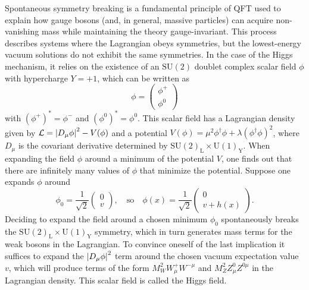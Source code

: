 Spontaneous symmetry breaking is a fundamental principle of QFT used to explain how gauge bosons (and, in general, massive particles) can acquire non-vanishing mass while maintaining the theory gauge-invariant. This process describes systems where the Lagrangian obeys symmetries, but the lowest-energy vacuum solutions do not exhibit the same symmetries. In the case of the Higgs mechanism, it relies on the existence of an $\text{SU}(2)$ doublet complex scalar field $\phi$ with hypercharge $Y = +1$, which can be written as 
\begin{equation*}
    \phi=
    \begin{pmatrix}
        \phi^{+} \\
        \phi^{0}
    \end{pmatrix}
\end{equation*}
with $(\phi^{+})^{*}=\phi^{-}$ and $(\phi^{0})^{*}=\phi^{0}$. This scalar field has a Lagrangian density given by $\mathcal{L}=\left\lvert D_{\mu}\phi\right\rvert^2 - V(\phi)$ and a potential $V(\phi) = \mu^2\phi^\dag\phi+\lambda(\phi^\dag\phi)^2$, where $D_\mu$ is the covariant derivative determined by $\text{SU}(2)_{\text{L}}\times \text{U}(1)_{\text{Y}}$. When expanding the field $\phi$ around a minimum of the potential $V$, one finds out that there are infinitely many values of $\phi$ that minimize the potential. Suppose one expands $\phi$ around
\begin{equation*}
    \phi_{0}=\frac{1}{\sqrt{2}}
    \begin{pmatrix}
        0 \\
        v
    \end{pmatrix},\quad \text{so}\quad
    \phi(x)=\frac{1}{\sqrt{2}}
    \begin{pmatrix}
        0 \\
        v + h(x)
    \end{pmatrix}.
\end{equation*}
Deciding to expand the field around a chosen minimum $\phi_{0}$ spontaneously breaks the $\text{SU}(2)_{\text{L}}\times \text{U}(1)_{\text{Y}}$ symmetry, which in turn generates mass terms for the weak bosons in the Lagrangian. To convince oneself of the last implication it suffices to expand the $\left\lvert D_{\mu}\phi\right\rvert^2$ term around the chosen vacuum expectation value $v$, which will produce terms of the form $M_{W}^2W_\mu^{+}W^{-\mu}$ and $M_{Z}^2Z_\mu^{0}Z^{0\mu}$ in the Lagrangian density. This scalar field is called the Higgs field.

